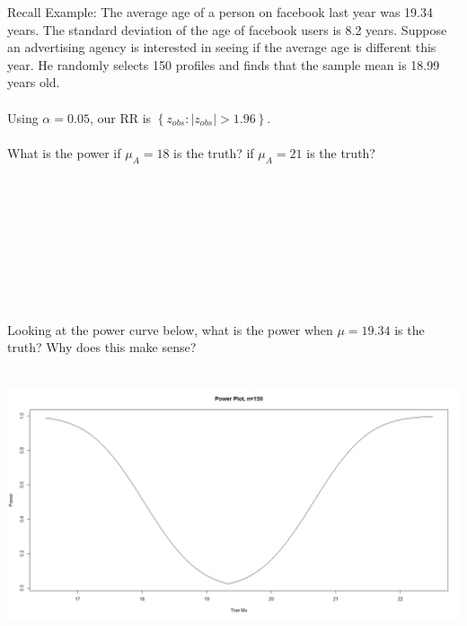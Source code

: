 Recall Example: The average age of a person on facebook last year was 19.34 years.  The standard deviation of the age of facebook users is 8.2 years.  Suppose an advertising agency is interested in seeing if the average age is different this year. He randomly selects 150 profiles and finds that the sample mean is 18.99 years old.\\~\\
Using $\alpha=0.05$, our RR is $\left\{z_{obs}:|z_{obs}|>1.96\right\}$.\\~\\
What is the power if $\mu_A=18$ is the truth?  if $\mu_A=21$ is the truth?\\~\\~\\~\\~\\~\\~\\~\\~\\~\\
Looking at the power curve below, what is the power when $\mu=19.34$ is the truth?  Why does this make sense?\\~\\
\begin{flushleft}
\includegraphics[scale=0.2]{powerplot2}
\end{flushleft}

\newpage

